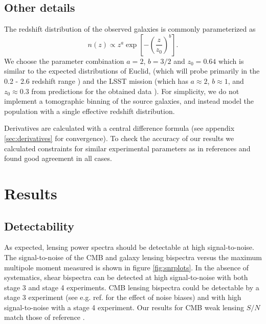 \documentclass[11pt]{article} %
\newcommand{\br}[1]{\ensuremath{\left( #1 \right)}}
\newcommand{\sbr}[1]{\ensuremath{\left[ #1 \right]}}
\begin{document}
\subsection{Other details}
The redshift distribution of the observed galaxies is commonly parameterized as \cite{bartelmann2001weak}
\begin{equation*}
    n(z) \propto z^a \exp\sbr{-\br{\frac{z}{z_0}}^b}.
\end{equation*}
We choose the parameter combination $a = 2$, $b = 3/2$ and $z_0 = 0.64$ which is similar to the expected distributions of Euclid, (which will probe primarily in the 0.2 - 2.6 redshift range \cite{euclidprep10})
and the LSST mission (which has $a \approx 2$, $b \approx 1$, and $z_0 \approx 0.3$ from predictions for the obtained data \cite{lsstsciencebookchapter3}). For simplicity, we do not implement a tomographic binning of the source galaxies, and instead model the population with a single effective redshift distribution.

Derivatives are calculated with a central difference formula (see appendix \ref{sec:derivatives} for convergence).  To check the accuracy of our results we calculated constraints for similar experimental parameters as in references \cite{Planck2018Lensing, Takada2003, cmbs4sciencebook,neutrinoconstraints} and found good agreement in all cases.

\section{Results}\label{sec:results}
\subsection{Detectability}
As expected, lensing power spectra should be detectable at high signal-to-noise. 
The signal-to-noise of the CMB and galaxy lensing bispectra versus the maximum multipole moment measured is shown in figure \ref{fig:snrplots}. In the absence of systematics, shear bispectra can be detected at high signal-to-noise with both stage 3 and stage 4 experiments. CMB lensing bispectra could be  detectable by a stage 3 experiment (see e.g. ref. \cite{Kalaja_2023} for the effect of noise biases) and with high signal-to-noise with a stage 4 experiment. Our results for CMB weak lensing $S/N$ match those of reference \cite{Namikawa_2016}.
\end{document}

